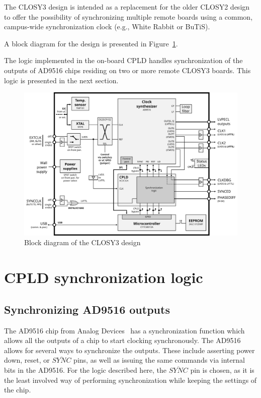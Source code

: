 \documentclass[a4paper,11pt]{article}
\begin{document}
The CLOSY3 design is intended as a replacement for the older CLOSY2 design to
offer the possibility of synchronizing multiple remote boards using a common,
campus-wide synchronization clock (e.g., White Rabbit or BuTiS).

A block diagram for the design is presented in Figure~\ref{fig:block-diagram}.

The logic implemented in the on-board CPLD handles synchronization of the outputs
of AD9516 chips residing on two or more remote CLOSY3 boards. This logic is presented
in the next section.

\begin{figure}[h]
  \centerline{\includegraphics[width=\textwidth]{fig/block-diagram}}
  \caption{\label{fig:block-diagram} Block diagram of the CLOSY3 design}
\end{figure}

\pagebreak
\section{CPLD synchronization logic}
\label{sec:logic}

\subsection{Synchronizing AD9516 outputs}

The AD9516 chip from Analog Devices~\cite{ad9516-3} has a synchronization function
which allows all the outputs of a chip to start clocking synchronously. The AD9516
allows for several ways to synchronize the outputs. These include asserting power down,
reset, or $\overline{SYNC}$ pins, as well as issuing the same commands via
internal bits in the AD9516. For the logic described here, the $\overline{SYNC}$
pin is chosen, as it is the least involved way of performing synchronization while
keeping the settings of the chip.
\end{document}
